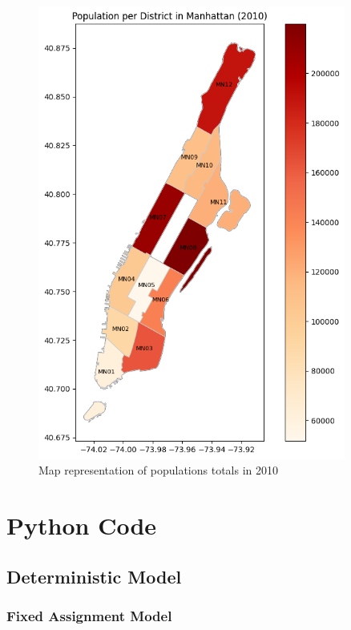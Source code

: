 \documentclass{article}
\begin{document}
\begin{figure}[H]
	\centering
	\includegraphics[width=0.9\textwidth]{figures/population.png}
	\caption{Map representation of populations totals in 2010}
	\label{fig:11all}
\end{figure}

\section{Python Code}
\subsection{Deterministic Model}
\subsubsection{Fixed Assignment Model}
\end{document}
